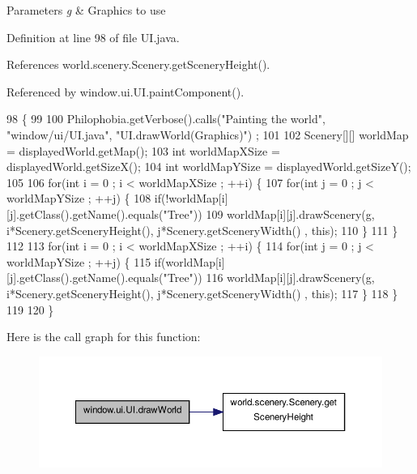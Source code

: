 \begin{DoxyParams}{Parameters}
{\em g} & Graphics to use \\
\hline
\end{DoxyParams}


Definition at line 98 of file U\-I.\-java.



References world.\-scenery.\-Scenery.\-get\-Scenery\-Height().



Referenced by window.\-ui.\-U\-I.\-paint\-Component().


\begin{DoxyCode}
98                                        \{
99     
100         Philophobia.getVerbose().calls(\textcolor{stringliteral}{"Painting the world"}, \textcolor{stringliteral}{"window/ui/UI.java"}, \textcolor{stringliteral}{"UI.drawWorld(Graphics)"})
      ;
101 
102         Scenery[][] worldMap = displayedWorld.getMap();
103         \textcolor{keywordtype}{int} worldMapXSize = displayedWorld.getSizeX();
104         \textcolor{keywordtype}{int} worldMapYSize = displayedWorld.getSizeY();
105 
106         \textcolor{keywordflow}{for}(\textcolor{keywordtype}{int} i = 0 ; i < worldMapXSize ; ++i) \{
107             \textcolor{keywordflow}{for}(\textcolor{keywordtype}{int} j = 0 ; j < worldMapYSize ; ++j) \{
108                 \textcolor{keywordflow}{if}(!worldMap[i][j].getClass().getName().equals(\textcolor{stringliteral}{"Tree"}))
109                     worldMap[i][j].drawScenery(g, i*Scenery.getSceneryHeight(), j*Scenery.getSceneryWidth()
      , \textcolor{keyword}{this});
110             \}
111         \}
112 
113         \textcolor{keywordflow}{for}(\textcolor{keywordtype}{int} i = 0 ; i < worldMapXSize ; ++i) \{
114             \textcolor{keywordflow}{for}(\textcolor{keywordtype}{int} j = 0 ; j < worldMapYSize ; ++j) \{
115                 \textcolor{keywordflow}{if}(worldMap[i][j].getClass().getName().equals(\textcolor{stringliteral}{"Tree"}))
116                     worldMap[i][j].drawScenery(g, i*Scenery.getSceneryHeight(), j*Scenery.getSceneryWidth()
      , \textcolor{keyword}{this});
117             \}
118         \}
119 
120     \}
\end{DoxyCode}


Here is the call graph for this function\-:
\nopagebreak
\begin{figure}[H]
\begin{center}
\leavevmode
\includegraphics[width=350pt]{a00034_ab8622a1cf2ea812537f90a9508bbe394_cgraph}
\end{center}
\end{figure}




